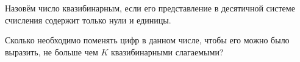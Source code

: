 Назовём число квазибинарным, если его представление в десятичной системе счисления содержит только нули и единицы.

Сколько необходимо поменять цифр в данном числе, чтобы его можно было выразить, не больше чем $K$ квазибинарными слагаемыми?
